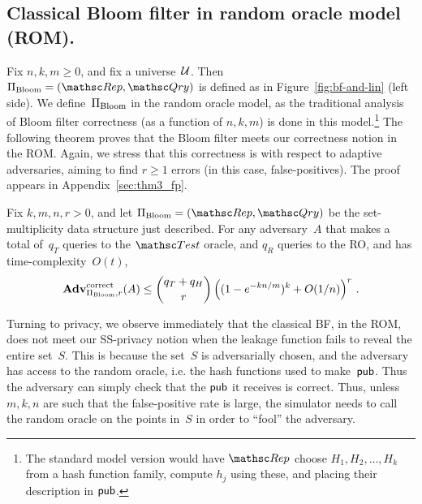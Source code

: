 \subsection{Classical Bloom filter in random oracle model (ROM). }

Fix $n,k,m \geq 0$, and fix a universe~${\cal U}$.  Then $\setprim_{\mathrm{Bloom}}= (\Rep, \Qry)$ is defined as in Figure~\ref{fig:bf-and-lin} (left side).  We define~$\Pi_{\mathrm{Bloom}}$ in the random oracle model, as the traditional analysis of Bloom filter correctness (as a function of $n,k,m$) is done in this model.\footnote{The standard model version would have $\Rep$ choose $H_1,H_2,\ldots,H_k$ from a hash function family, compute $h_j$ using these, and placing their description in ${\sf pub}$.}  The following theorem proves that the Bloom filter meets our correctness notion in the ROM.  Again, we stress that this correctness is with respect to adaptive adversaries, aiming to find $r \geq 1$ errors (in this case, false-positives).
The proof appears in Appendix~\ref{sec:thm3_fp}.

\begin{theorem}\label{thm3}\label{thm:bf-correctness}
Fix $k,m,n,r>0$, and let $\setprim_{\mathrm{Bloom}}= (\Rep, \Qry)$ be the set-multiplicity data structure just described. For any adversary~$A$ that makes a total of~$q_T$ queries to the $\Test$ oracle, and $q_R$ queries to the RO, and has time-complexity~$O(t)$,
\[
\mathrm{\mathbf{Adv}}^{\mathrm{correct}}_{\Pi_{\mathrm{Bloom}},r}(A) \leq  {\dbinom{q_T + q_H}{r}} \left( (1-e^{-kn/m})^k + O(1/n) \right)^r\,.
\]
\end{theorem}

%

Turning to privacy, we observe immediately that the classical BF, in the
ROM, does not meet our SS-privacy notion when the leakage function
fails to reveal the entire set~$S$.  This is because the set~$S$ is
adversarially chosen, and the adversary has access to the random
oracle, i.e. the hash functions used to make~${\sf pub}$.  Thus the
adversary can simply check that the ${\sf pub}$ it receives is correct.
Thus, unless $m,k,n$ are such that the false-positive rate is large,
the simulator needs to call the random oracle on the points in~$S$ in order to ``fool'' the adversary.

